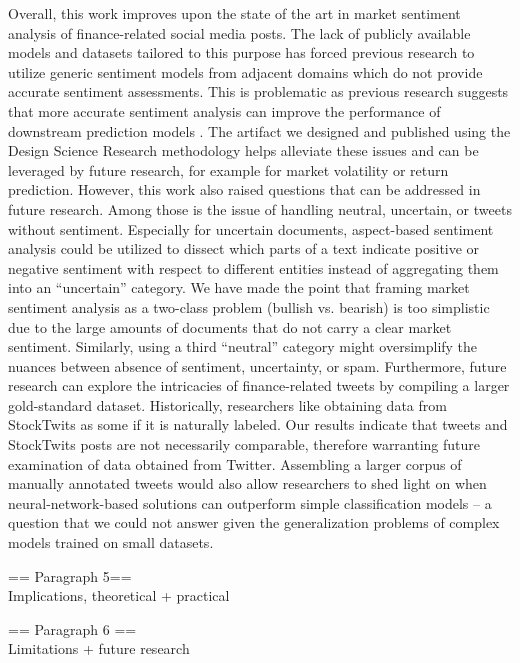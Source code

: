 Overall, this work improves upon the state of the art in market sentiment analysis of finance-related social media posts. The lack of publicly available models and datasets tailored to this purpose has forced previous research to utilize generic sentiment models from adjacent domains which do not provide accurate sentiment assessments. This is problematic as previous research suggests that more accurate sentiment analysis can improve the performance of downstream prediction models . The artifact we designed and published using the Design Science Research methodology helps alleviate these issues and can be leveraged by future research, for example for market volatility or return prediction.\newline
However, this work also raised questions that can be addressed in future research. Among those is the issue of handling neutral, uncertain, or tweets without sentiment. Especially for uncertain documents, aspect-based sentiment analysis could be utilized to dissect which parts of a text indicate positive or negative sentiment with respect to different entities instead of aggregating them into an ``uncertain'' category. We have made the point that framing market sentiment analysis as a two-class problem (bullish vs. bearish) is too simplistic due to the large amounts of documents that do not carry a clear market sentiment. Similarly, using a third ``neutral'' category might oversimplify the nuances between absence of sentiment, uncertainty, or spam.
Furthermore, future research can explore the intricacies of finance-related tweets by compiling a larger gold-standard dataset. Historically, researchers like obtaining data from StockTwits as some if it is naturally labeled. Our results indicate that tweets and StockTwits posts are not necessarily comparable, therefore warranting future examination of data obtained from Twitter. Assembling a larger corpus of manually annotated tweets would also allow researchers to shed light on when neural-network-based solutions can outperform simple classification models -- a question that we could not answer given the generalization problems of complex models trained on small datasets.

== Paragraph 5==\\
Implications, theoretical + practical

== Paragraph 6 ==\\
Limitations + future research










